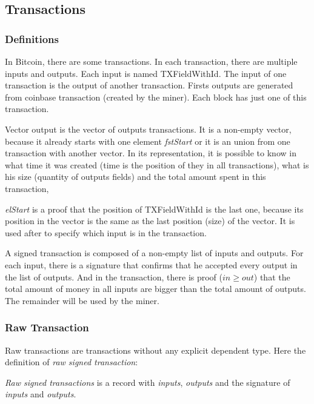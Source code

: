 \subsection{Transactions}

\subsubsection{Definitions}

In Bitcoin, there are some transactions.
In each transaction, there are multiple inputs and outputs.
Each input is named TXFieldWithId.
The input of one transaction is the output of another transaction.
Firsts outputs are generated from coinbase transaction (created by the miner).
Each block has just one of this transaction.


Vector output is the vector of outputs transactions.
It is a non-empty vector, because it already starts with one element \emph{fstStart}
or it is an union from one transaction with another vector.
In its representation, it is possible to know in what time it was created (time is the position of
they in all transactions),
what is his size (quantity of outputs fields)
and the total amount spent in this transaction,

\emph{elStart} is a proof that the position of TXFieldWithId is the last one,
because its position in the vector is the same as the last position (size) of the vector.
It is used after to specify which input is in the transaction.


A signed transaction is composed of a non-empty list of inputs and outputs.
For each input, there is a signature that confirms that he accepted every output in the list of outputs.
And in the transaction, there is proof ($in \geq out$) that the total amount of money
in all inputs are bigger than the total amount of outputs.
The remainder will be used by the miner.

\subsubsection{Raw Transaction}

Raw transactions are transactions without any explicit dependent type.
Here the definition of \emph{raw signed transaction}:


\emph{Raw signed transactions} is a record with \emph{inputs}, \emph{outputs}
and the signature of \emph{inputs} and \emph{outputs}.

